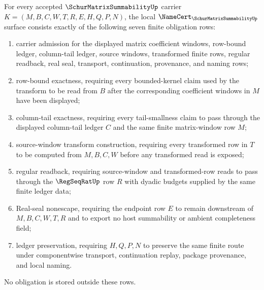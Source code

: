 \begin{theorem}\label{thm:schur-matrix-summability-namecert-obligations}
For every accepted $\SchurMatrixSummabilityUp$ carrier $K=(M,B,C,W,T,R,E,H,Q,P,N)$, the local $\NameCert_{\SchurMatrixSummabilityUp}$ surface consists exactly of the following seven finite obligation rows:
\begin{enumerate}
\item carrier admission for the displayed matrix coefficient windows, row-bound ledger, column-tail ledger, source windows, transformed finite rows, regular readback, real seal, transport, continuation, provenance, and naming rows;
\item row-bound exactness, requiring every bounded-kernel claim used by the transform to be read from $B$ after the corresponding coefficient windows in $M$ have been displayed;
\item column-tail exactness, requiring every tail-smallness claim to pass through the displayed column-tail ledger $C$ and the same finite matrix-window row $M$;
\item source-window transform construction, requiring every transformed row in $T$ to be computed from $M,B,C,W$ before any transformed read is exposed;
\item regular readback, requiring source-window and transformed-row reads to pass through the $\RegSeqRatUp$ row $R$ with dyadic budgets supplied by the same finite ledger data;
\item Real-seal nonescape, requiring the endpoint row $E$ to remain downstream of $M,B,C,W,T,R$ and to export no host summability or ambient completeness field;
\item ledger preservation, requiring $H,Q,P,N$ to preserve the same finite route under componentwise transport, continuation replay, package provenance, and local naming.
\end{enumerate}
No obligation is stored outside these rows.
\end{theorem}
